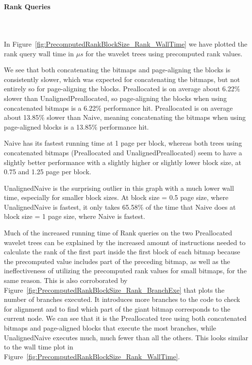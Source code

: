 \paragraph{Rank Queries}~\\\\
In Figure~\ref{fig:PrecomputedRankBlockSize_Rank_WallTime} we have plotted the rank query wall time in $\mu s$ for the wavelet trees using precomputed rank values.

We see that both concatenating the bitmaps and page-aligning the blocks is consistently slower, which was expected for concatenating the bitmaps, but not entirely so for page-aligning the blocks.
Preallocated is on average about 6.22\% slower than UnalignedPreallocated, so page-aligning the blocks when using concatenated bitmaps is a 6.22\% performance hit.
Preallocated is on average about 13.85\% slower than Naive, meaning concatenating the bitmaps when using page-aligned blocks is a 13.85\% performance hit.

Naive has its fastest running time at 1 page per block, whereas both trees using concatenated bitmaps (Preallocated and UnalignedPreallocated) seem to have a slightly better performance with a slightly higher or slightly lower block size, at 0.75 and 1.25 page per block.

UnalignedNaive is the surprising outlier in this graph with a much lower wall time, especially for smaller block sizes.
At block size = 0.5 page size, where UnalignedNaive is fastest, it only takes 65.58\% of the time that Naive does at block size = 1 page size, where Naive is fastest.

Much of the increased running time of Rank queries on the two Preallocated wavelet trees can be explained by the increased amount of instructions needed to calculate the rank of the first part inside the first block of each bitmap because the precomputed value includes part of the preceding bitmap, as well as the ineffectiveness of utilizing the precomputed rank values for small bitmaps, for the same reason.
This is also corroborated by Figure~\ref{fig:PrecomputedRankBlockSize_Rank_BranchExe} that plots the number of branches executed.
It introduces more branches to the code to check for alignment and to find which part of the giant bitmap corresponds to the current node.
We can see that it is the Preallocated tree using both concatenated bitmaps and page-aligned blocks that execute the most branches, while UnalignedNaive executes much, much fewer than all the others.
This looks similar to the wall time plot in Figure~\ref{fig:PrecomputedRankBlockSize_Rank_WallTime}.

